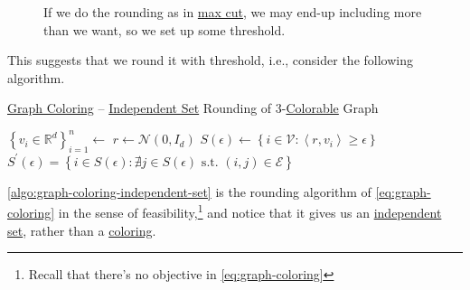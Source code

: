\begin{figure}[H]
	\centering
	\caption{If we do the rounding as in \hyperref[prb:max-cut]{max cut}, we may end-up including more than we want, so we set up some threshold.}
	\label{fig:3-coloring-threshold}
\end{figure}

This suggests that we round it with threshold, i.e., consider the following algorithm.

\begin{algorithm}[H]\label{algo:graph-coloring-independent-set}
	\DontPrintSemicolon
	\caption{\hyperref[prb:graph-coloring]{Graph Coloring} -- \hyperref[def:independent-set]{Independent Set} Rounding of \(3\)-\hyperref[def:coloring]{Colorable} Graph}
	\BlankLine
	\(\left\{ v_i \in \mathbb{R} ^d\right\} _{i=1}^n \gets\)\;
	\(r \gets \mathcal{N} (0, I_d)\)\label{algo:graph-coloring-independent-set-r}
	\(S(\epsilon )\gets\left\{ i\in \mathcal{V} \colon \left\langle r, v_i \right\rangle \geq \epsilon   \right\} \)
	\(S^\prime (\epsilon )= \left\{ i\in S(\epsilon )\colon \nexists j\in S(\epsilon ) \text{ s.t. } (i, j)\in \mathcal{E} \right\} \)
	\;
\end{algorithm}

\begin{remark}
	\autoref{algo:graph-coloring-independent-set} is the rounding algorithm of \autoref{eq:graph-coloring} in the sense of feasibility,\footnote{Recall that there's no objective in \autoref{eq:graph-coloring}} and notice that it gives us an \hyperref[def:independent-set]{independent set}, rather than a \hyperref[def:coloring]{coloring}.
\end{remark}